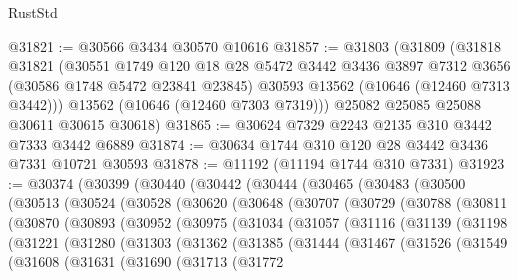 \begin{lexlean}{RustStd}
\begin{coremodule}
@31821 := @30566 @3434 @30570 @10616
@31857 := @31803
    (@31809
      (@31818
        @31821
        (@30551
          @1749
          @120
          @18
          @28
          @5472
          @3442
          @3436
          @3897
          @7312
          @3656
          (@30586 @1748 @5472 @23841 @23845)
          @30593
          @13562
          (@10646 (@12460 @7313 @3442)))
        @13562
        (@10646 (@12460 @7303 @7319)))
      @25082
      @25085
      @25088
      @30611
      @30615
      @30618)
@31865 := @30624 @7329 @2243 @2135 @310 @3442 @7333 @3442 @6889
@31874 := @30634 @1744 @310 @120 @28 @3442 @3436 @7331 @10721 @30593
@31878 := @11192 (@11194 @1744 @310 @7331)
@31923 := @30374
    (@30399
      (@30440
        (@30442
          (@30444
            (@30465
              (@30483
                (@30500
                  (@30513
                    (@30524
                      (@30528
                        (@30620
                          (@30648
                            (@30707
                              (@30729
                                (@30788
                                  (@30811
                                    (@30870
                                      (@30893
                                        (@30952
                                          (@30975
                                            (@31034
                                              (@31057
                                                (@31116
                                                  (@31139
                                                    (@31198
                                                      (@31221
                                                        (@31280
                                                          (@31303
                                                            (@31362
                                                              (@31385
                                                                (@31444
                                                                  (@31467
                                                                    (@31526
                                                                      (@31549
                                                                        (@31608
                                                                          (@31631
                                                                            (@31690
                                                                              (@31713
                                                                                (@31772

\end{coremodule}
\end{lexlean}

